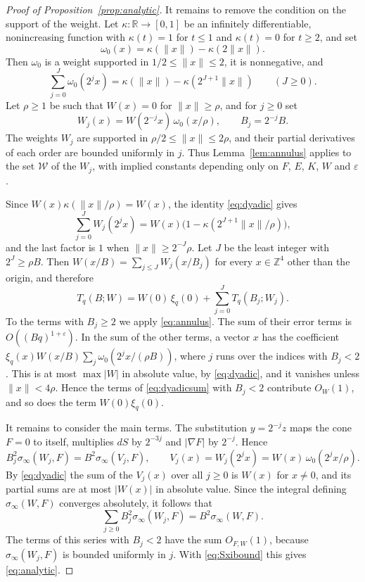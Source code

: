 \documentclass[11pt]{amsart}
\numberwithin{equation}{section}
\numberwithin{figure}{section}
\theoremstyle{definition}
\newcommand{\Z}{\mathbb{Z}}
\newcommand{\R}{\mathbb{R}}
\newcommand{\eps}{\varepsilon}
\newcommand{\abs}[1]{\lvert #1\rvert}
\begin{document}
\begin{proof}[Proof of Proposition~\ref{prop:analytic}]
It remains to remove the condition on the support of the weight. Let
$\kappa:\R\to[0,1]$ be an infinitely differentiable, nonincreasing
function with $\kappa(t)=1$ for $t\le1$ and $\kappa(t)=0$ for
$t\ge2$, and set
\[
 \omega_0(x)=\kappa(\lVert x\rVert)-\kappa(2\lVert x\rVert).
\]
Then $\omega_0$ is a weight supported in
$1/2\le\lVert x\rVert\le2$, it is nonnegative, and
\begin{equation}\label{eq:dyadic}
 \sum_{j=0}^J\omega_0(2^jx)=\kappa(\lVert x\rVert)-\kappa(2^{J+1}\lVert x\rVert)
 \qquad(J\ge0).
\end{equation}
Let $\rho\ge1$ be such that $W(x)=0$ for $\lVert x\rVert\ge\rho$, and
for $j\ge0$ set
\[
 W_j(x)=W(2^{-j}x)\,\omega_0(x/\rho),\qquad B_j=2^{-j}B.
\]
The weights $W_j$ are supported in $\rho/2\le\lVert x\rVert\le2\rho$,
and their partial derivatives of each order are bounded uniformly in
$j$. Thus Lemma~\ref{lem:annulus} applies to the set $\mathcal W$ of
the $W_j$, with implied constants depending only on $F$, $E$, $K$,
$W$ and $\eps$.

Since $W(x)\kappa(\lVert x\rVert/\rho)=W(x)$, the identity
\eqref{eq:dyadic} gives
\[
 \sum_{j=0}^JW_j(2^jx)=W(x)\big(1-\kappa(2^{J+1}\lVert x\rVert/\rho)\big),
\]
and the last factor is $1$ when $\lVert x\rVert\ge2^{-J}\rho$. Let
$J$ be the least integer with $2^J\ge\rho B$. Then
$W(x/B)=\sum_{j\le J}W_j(x/B_j)$ for every $x\in\Z^4$ other than the
origin, and therefore
\begin{equation}\label{eq:dyadicsum}
 T_q(B;W)=W(0)\,\xi_q(0)+\sum_{j=0}^JT_q(B_j;W_j).
\end{equation}
To the terms with $B_j\ge2$ we apply \eqref{eq:annulus}. The sum of
their error terms is $O((Bq)^{1+\eps})$. In the sum of the other
terms, a vector $x$ has the coefficient
$\xi_q(x)W(x/B)\sum_j\omega_0(2^jx/(\rho B))$, where $j$ runs over
the indices with $B_j<2$. This is at most $\max\abs W$ in absolute
value, by \eqref{eq:dyadic}, and it vanishes unless
$\lVert x\rVert<4\rho$. Hence the terms of \eqref{eq:dyadicsum} with
$B_j<2$ contribute $O_W(1)$, and so does the term $W(0)\xi_q(0)$.

It remains to consider the main terms. The substitution
$y=2^{-j}z$ maps the cone $F=0$ to itself, multiplies $dS$ by
$2^{-3j}$ and $\abs{\nabla F}$ by $2^{-j}$. Hence
\[
 B_j^2\sigma_\infty(W_j,F)=B^2\sigma_\infty(V_j,F),\qquad
 V_j(x)=W_j(2^jx)=W(x)\,\omega_0(2^jx/\rho).
\]
By \eqref{eq:dyadic} the sum of the $V_j(x)$ over all $j\ge0$ is
$W(x)$ for $x\ne0$, and its partial sums are at most $\abs{W(x)}$ in
absolute value. Since the integral defining $\sigma_\infty(W,F)$
converges absolutely, it follows that
\[
 \sum_{j\ge0}B_j^2\sigma_\infty(W_j,F)=B^2\sigma_\infty(W,F).
\]
The terms of this series with $B_j<2$ have the sum $O_{F,W}(1)$,
because $\sigma_\infty(W_j,F)$ is bounded uniformly in $j$. With
\eqref{eq:Sxibound} this gives \eqref{eq:analytic}.
\end{proof}
\end{document}
